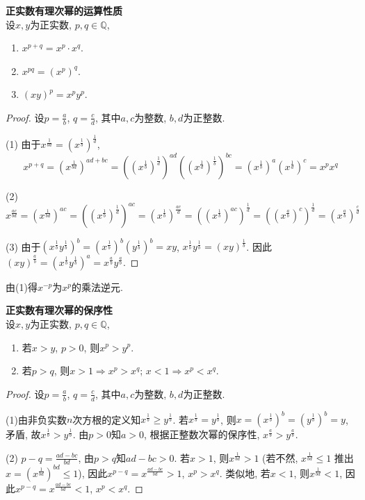 \begin{pro} \textbf{正实数有理次幂的运算性质}\\
设$x,y$为正实数, $p,q\in \mathbb{Q}$, 
\begin{enumerate}
\item $x^{p+q}=x^p\cdot x^q$.
\item $x^{pq}=(x^p)^q$.
\item $(xy)^p = x^py^p$.
\end{enumerate}
\end{pro}
\begin{proof} 设$p=\frac{a}{b}$, $q=\frac{c}{d}$, 其中$a,c$为整数, $b,d$为正整数. 
\par (1) 由于$x^{\frac{1}{bd}}=(x^{\frac{1}{b}})^{\frac{1}{d}}$, 
\begin{equation}
    x^{p+q}=(x^{\frac{1}{bd}})^{ad+bc}=((x^{\frac{1}{b}})^{\frac{1}{d}})^{ad} ((x^{\frac{1}{d}})^{\frac{1}{b}})^{bc}=(x^{\frac{1}{b}})^{a} (x^{\frac{1}{d}})^{c} = x^px^q
\end{equation}
\par (2) 
\begin{equation}
    x^{\frac{ac}{bd}}=(x^{\frac{1}{bd}})^{ac}=((x^{\frac{1}{b}})^{\frac{1}{d}})^{ac} = (x^{\frac{1}{b}})^{\frac{ac}{d}}=((x^{\frac{1}{b}})^{ac})^{\frac{1}{d}} = ((x^{\frac{a}{b}})^{c})^{\frac{1}{d}} = (x^{\frac{a}{b}})^{\frac{c}{d}}
\end{equation}
\par (3) 由于$(x^{\frac{1}{b}}y^{\frac{1}{b}})^b = (x^{\frac{1}{b}})^b (y^{\frac{1}{b}})^b = xy$, $x^{\frac{1}{b}}y^{\frac{1}{b}} = (xy)^{\frac{1}{b}}$. 因此$(xy)^{\frac{a}{b}}=(x^{\frac{1}{b}}y^{\frac{1}{b}})^a=x^{\frac{a}{b}}y^{\frac{a}{b}}$. 
\end{proof}
\par 由(1)得$x^{-p}$为$x^p$的乘法逆元. 

\begin{pro} \textbf{正实数有理次幂的保序性}\\
设$x,y$为正实数, $p,q\in \mathbb{Q}$, 
\begin{enumerate}
\item 若$x>y$, $p>0$, 则$x^p>y^p$. 
\item 若$p>q$, 则$x>1\Rightarrow x^p>x^q$; $x<1\Rightarrow x^p<x^q$. 
\end{enumerate}
\end{pro}
\begin{proof} 设$p=\frac{a}{b}$, $q=\frac{c}{d}$, 其中$a,c$为整数, $b,d$为正整数. 
\par (1)由非负实数$n$次方根的定义知$x^{\frac{1}{b}}\ge y^{\frac{1}{b}}$. 若$x^{\frac{1}{b}}=y^{\frac{1}{b}}$, 则$x=(x^{\frac{1}{b}})^b = (y^{\frac{1}{b}})^b = y$, 矛盾, 故$x^{\frac{1}{b}}> y^{\frac{1}{b}}$. 由$p>0$知$a>0$, 根据正整数次幂的保序性, $x^{\frac{a}{b}}> y^{\frac{a}{b}}$.
\par (2) $p-q=\frac{ad-bc}{bd}$, 由$p>q$知$ad-bc>0$. 若$x>1$, 则$x^{\frac{1}{bd}}>1$ (若不然, $x^{\frac{1}{bd}}\le 1$ 推出$x=(x^{\frac{1}{bd}})^{bd}\le 1$), 因此$x^{p-q}=x^{\frac{ad-bc}{bd}}>1$, $x^p>x^q$. 类似地, 若$x<1$, 则$x^{\frac{1}{bd}}<1$, 因此$x^{p-q}=x^{\frac{ad-bc}{bd}}<1$, $x^p<x^q$.
\end{proof}

